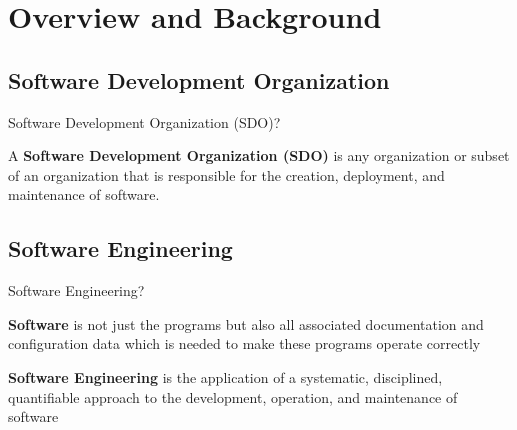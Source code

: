 \section{Overview and Background}

    \subsection{Software Development Organization}
    
        \begin{frame}{Software Development Organization (SDO)?}
            \begin{displayquote}
                 A \textbf{Software Development Organization (SDO)} is any
                 organization or subset of an organization that is 
                 responsible for the creation, deployment, and 
                 maintenance of software. 
            \end{displayquote}
        \end{frame}
        
    \subsection{Software Engineering}
        \begin{frame}{Software Engineering?}
            \begin{displayquote}
                 \textbf{Software} is not just the
                    programs but also all associated documentation and 
                    configuration data which is
                    needed to make these programs operate correctly
                    \cite{Sommerville2001}
            \end{displayquote} 
            
            \begin{displayquote}
                \textbf{Software Engineering} is the application 
                of a systematic, disciplined, quantifiable
                approach to the development, operation, and maintenance of software
                \cite{Ieee1990} 
            \end{displayquote} 
        \end{frame}
    
